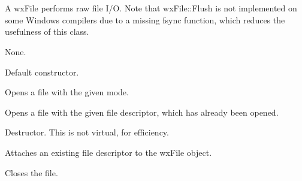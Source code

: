 \section{}\label{wxfile}

A wxFile performs raw file I/O. Note that wxFile::Flush is not implemented on some Windows compilers
due to a missing fsync function, which reduces the usefulness of this class.


None.


\label{wxfileconstr}


Default constructor.


Opens a file with the given mode.


Opens a file with the given file descriptor, which has already been opened.







Destructor. This is not virtual, for efficiency.

\label{wxfileattach}


Attaches an existing file descriptor to the wxFile object.

\label{wxfileclose}


Closes the file.

\label{wxfilecreate}


